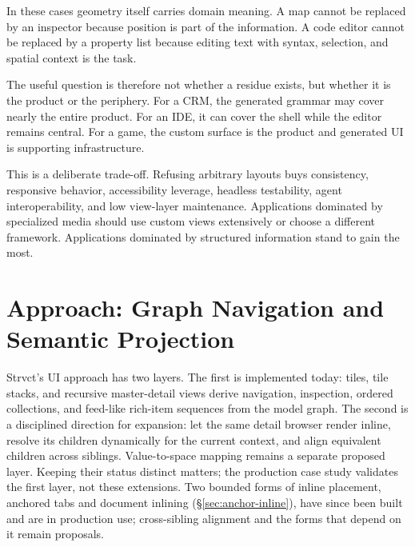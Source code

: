 \documentclass[sigplan,review,anonymous,10pt]{acmart}
\begin{document}
In these cases geometry itself carries domain meaning. A map cannot be replaced by an inspector because position is part of the information. A code editor cannot be replaced by a property list because editing text with syntax, selection, and spatial context is the task.

The useful question is therefore not whether a residue exists, but whether it is the product or the periphery. For a CRM, the generated grammar may cover nearly the entire product. For an IDE, it can cover the shell while the editor remains central. For a game, the custom surface is the product and generated UI is supporting infrastructure.

This is a deliberate trade-off. Refusing arbitrary layouts buys consistency, responsive behavior, accessibility leverage, headless testability, agent interoperability, and low view-layer maintenance. Applications dominated by specialized media should use custom views extensively or choose a different framework. Applications dominated by structured information stand to gain the most.

\section{Approach: Graph Navigation and Semantic Projection}
\label{sec:approach}

Strvct's UI approach has two layers. The first is implemented today: tiles, tile stacks, and recursive master-detail views derive navigation, inspection, ordered collections, and feed-like rich-item sequences from the model graph. The second is a disciplined direction for expansion: let the same detail browser render inline, resolve its children dynamically for the current context, and align equivalent children across siblings. Value-to-space mapping remains a separate proposed layer. Keeping their status distinct matters; the production case study validates the first layer, not these extensions. Two bounded forms of inline placement, anchored tabs and document inlining (\S\ref{sec:anchor-inline}), have since been built and are in production use; cross-sibling alignment and the forms that depend on it remain proposals.
\end{document}
